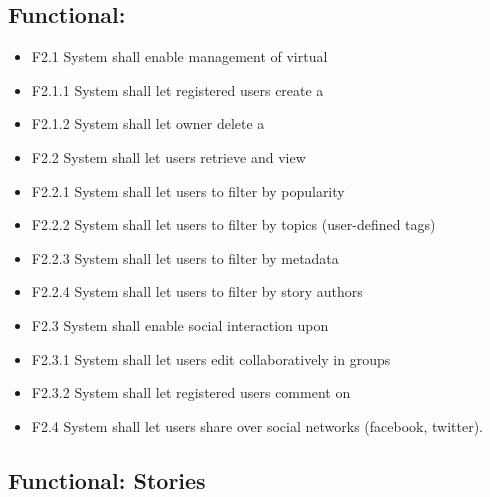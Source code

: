 \documentclass[11pt]{book}
\begin{document}
\subsection{Functional: \wallentitypcap}\label{functional-walls}

\begin{itemize}
  \item F2.1 System shall enable management of virtual \wallentityp
  \item F2.1.1 System shall let registered users create a \wallentitys
  \item F2.1.2 System shall let owner delete a \wallentitys
  \item F2.2 System shall let users retrieve and view \wallentityp
  \item F2.2.1 System shall let users to filter \wallentityp by popularity
  \item F2.2.2 System shall let users to filter \wallentityp by topics (user-defined
  tags)
  \item F2.2.3 System shall let users to filter \wallentityp by metadata
  \item F2.2.4 System shall let users to filter \wallentityp by story authors
  \item F2.3 System shall enable social interaction upon \wallentityp
  \item F2.3.1 System shall let users edit \wallentityp collaboratively in groups
  \item F2.3.2 System shall let registered users comment on \wallentityp
  \item F2.4 System shall let users share \wallentitys over social networks (facebook,
  twitter).
\end{itemize}

\subsection{Functional: Stories}\label{functional-stories}
\end{document}
